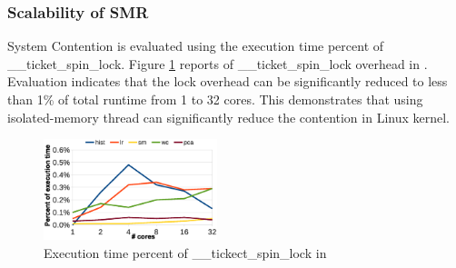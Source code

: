 



\subsubsection{Scalability of SMR}
System Contention is evaluated using the execution time percent of \_\_ticket\_spin\_lock.
Figure \ref{fig:smr:spinlock} reports of \_\_ticket\_spin\_lock overhead in \myds.
Evaluation indicates that the lock overhead can be significantly reduced to less than 1\% of total runtime from 1 to 32 cores.
This demonstrates that using isolated-memory \myth thread can  
significantly reduce the contention in Linux kernel.


 
\begin{figure}[!h!t]  
	\centering
	\includegraphics[width=0.45\textwidth]{eps/dmr_spinlock.eps}
	\caption{Execution time percent of \_\_tickect\_spin\_lock in \myds}
	\label{fig:smr:spinlock}
\end{figure}

